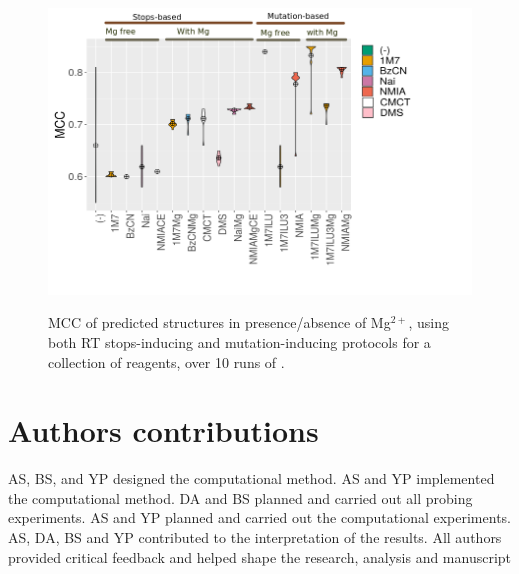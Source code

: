 \documentclass[a4,center,fleqn]{NAR}
\begin{document}
\begin{figure}
	{\centering\includegraphics[width=1.2\linewidth]{graphs/boxplotreproducibility.png}\\}
	
	\caption{MCC of predicted structures in presence/absence of Mg$^{2+}$, using both RT stops-inducing and mutation-inducing protocols for a collection of reagents, over 10 runs of \OurTool{}. }\label{fig:reproducibility}
\end{figure}




%
%
%
%
%	
%	

\section*{Authors contributions}
AS, BS, and YP designed the computational method. 
AS and YP implemented the computational method.
DA and BS planned and carried out all probing experiments.
AS and YP planned and carried out the computational experiments. 
AS, DA, BS and YP contributed to the interpretation of the results. 
All authors provided critical feedback and helped shape the research, analysis and manuscript
\end{document}

